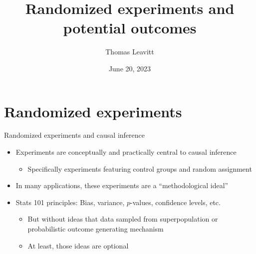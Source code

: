 \documentclass[table, xcolor = {dvipsnames}, 9pt]{beamer}
\title[]{Randomized experiments and potential outcomes} %
\author{Thomas Leavitt} %
\institute[] %
{
\medskip
\textit{} %
}
\date{June 20, 2023} %
\theoremstyle{plain}
\begin{document}
\begin{frame}
\titlepage %
\end{frame}


\section{Randomized experiments}
\begin{frame}{Randomized experiments and causal inference}
\vfill
\begin{itemize}
\item Experiments are conceptually and practically central to causal inference \vfill
\begin{itemize} \vfill
\item Specifically experiments featuring control groups and random assignment \vfill
\end{itemize} \vfill
\item In many applications, these experiments are a ``methodological ideal'' \vfill
\item Stats 101 principles: Bias, variance, $p$-values, confidence levels, etc. \vfill
\begin{itemize} \vfill
\item But without ideas that data sampled from superpopulation or probabilistic outcome generating mechanism \vfill
\item At least, those ideas are optional \vfill
\end{itemize} \vfill
\end{itemize} \vfill
\end{frame}
\end{document}
